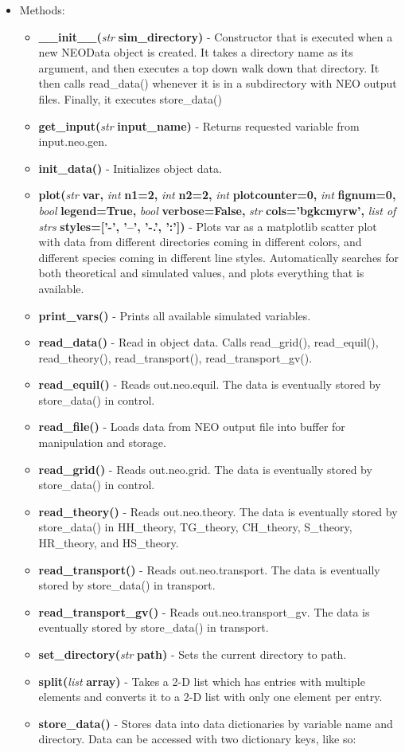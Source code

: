 \documentclass{article}
\begin{document}
\begin{itemize}
\begin{itemize}
\end{itemize}
\item Methods:
\begin{itemize}
\item \textbf{\_\_init\_\_(}\emph{str} \textbf{sim\_directory)} - Constructor that is executed when a new NEOData object is created.  It takes a directory name as its argument, and then executes a top down walk down that directory.  It then calls read\_data() whenever it is in a subdirectory with NEO output files.  Finally, it executes store\_data()
\item \textbf{get\_input(}\emph{str} \textbf{input\_name)} - Returns requested variable from input.neo.gen.
\item \textbf{init\_data()} - Initializes object data.
\item \textbf{plot(}\emph{str} \textbf{var, }\emph{int} \textbf{n1=2, }\emph{int} \textbf{n2=2,} \emph{int} \textbf{plotcounter=0,} \emph{int} \textbf{fignum=0,} \emph{bool} \textbf{legend=True,} \emph{bool} \textbf{verbose=False,} \emph{str} \textbf{cols='bgkcmyrw',} \emph{list of strs} \textbf{styles=['-', '--', '-.', ':'])} - Plots var as a matplotlib scatter plot with data from different directories coming in different colors, and different species coming in different line styles.  Automatically searches for both theoretical and simulated values, and plots everything that is available.
\item \textbf{print\_vars()} - Prints all available simulated variables.
\item \textbf{read\_data()} - Read in object data.  Calls read\_grid(), read\_equil(), read\_theory(), read\_transport(), read\_transport\_gv().
\item \textbf{read\_equil()} - Reads out.neo.equil.  The data is eventually stored by store\_data() in control.
\item \textbf{read\_file()} - Loads data from NEO output file into buffer for manipulation and storage.
\item \textbf{read\_grid()} - Reads out.neo.grid.  The data is eventually stored by store\_data() in control.
\item \textbf{read\_theory()} - Reads out.neo.theory.  The data is eventually stored by store\_data() in HH\_theory, TG\_theory, CH\_theory, S\_theory, HR\_theory, and HS\_theory.
\item \textbf{read\_transport()} - Reads out.neo.transport.  The data is eventually stored by store\_data() in transport.
\item \textbf{read\_transport\_gv()} - Reads out.neo.transport\_gv.  The data is eventually stored by store\_data() in transport.
\item \textbf{set\_directory(}\emph{str} \textbf{path)} - Sets the current directory to path.
\item \textbf{split(}\emph{list} \textbf{array)} - Takes a 2-D list which has entries with multiple elements and converts it to a 2-D list with only one element per entry.
\item \textbf{store\_data()} - Stores data into data dictionaries by variable name and directory.  Data can be accessed with two dictionary keys, like so:


\end{itemize}
\end{itemize}
\end{document}

